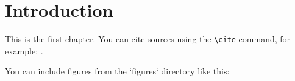 
\chapter{Introduction}
\label{chap:introduction}

This is the first chapter. You can cite sources using the \verb|\cite| command, for example: \cite{example_citation}.

You can include figures from the `figures` directory like this:
